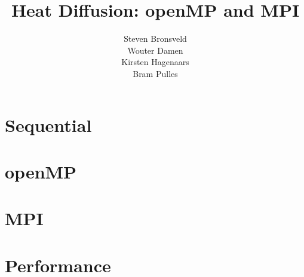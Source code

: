 \documentclass[a4paper]{article}
\author{Steven Bronsveld\\Wouter Damen\\Kirsten Hagenaars\\Bram Pulles}
\title{\textbf{Heat Diffusion: openMP and MPI}}
\begin{document}
\maketitle

\tableofcontents

\pagebreak
\section{Sequential}

\section{openMP}

\section{MPI}

\section{Performance}
\end{document}
